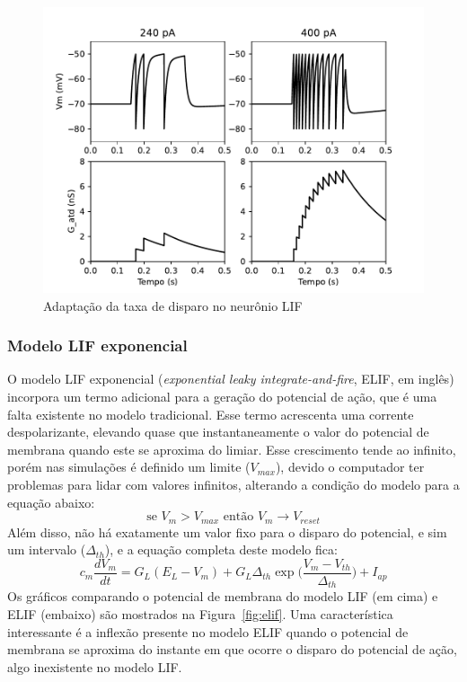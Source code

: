 \begin{figure}[tb]
	\centering
	\caption{Adaptação da taxa de disparo no neurônio LIF}
	\label{fig:lifatd}
	\includegraphics[width=0.7\linewidth]{figs/lif_atd}
\end{figure}

\subsubsection{Modelo LIF exponencial}
O modelo LIF exponencial (\textit{exponential leaky integrate-and-fire}, ELIF, em inglês) incorpora um termo adicional para a geração do potencial de ação, que é uma falta existente no modelo tradicional. Esse termo acrescenta uma corrente despolarizante, elevando quase que instantaneamente o valor do potencial de membrana quando este se aproxima do limiar. Esse crescimento tende ao infinito, porém nas simulações é definido um limite ($V_{max}$), devido o computador ter problemas para lidar com valores infinitos, alterando a condição do modelo para a equação abaixo:
\begin{equation}\label{eq:elif_cond}
	\text{se } V_m > V_{max} \text{ então } V_m\to V_{reset}
\end{equation}
Além disso, não há exatamente um valor fixo para o disparo do potencial, e sim um intervalo ($\Delta_{th}$), e a equação completa deste modelo fica:
\begin{equation}\label{eq:elif}
	c_m\frac{dV_m}{dt} = G_L(E_L-V_m) + G_L\Delta_{th}\exp\Big(\frac{V_m-V_{th}}{\Delta_{th}}\Big) + I_{ap}
\end{equation}
Os gráficos comparando o potencial de membrana do modelo LIF (em cima) e ELIF (embaixo) são mostrados na Figura~\ref{fig:elif}. Uma característica interessante é a inflexão presente no modelo ELIF quando o potencial de membrana se aproxima do instante em que ocorre o disparo do potencial de ação, algo inexistente no modelo LIF.

